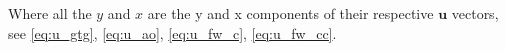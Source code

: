 Where all the $y$ and $x$ are the y and x components of their respective $\mathbf{u}$ vectors, see \eqref{eq:u_gtg}, \eqref{eq:u_ao}, \eqref{eq:u_fw_c}, \eqref{eq:u_fw_cc}.

